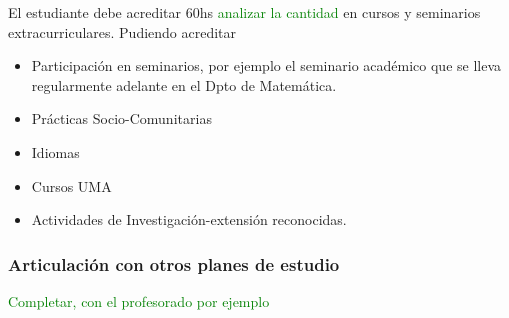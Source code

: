 \documentclass[a4paper, 12pt]{article}
\begin{document}
El estudiante debe acreditar 60hs \textcolor{green}{analizar la cantidad}
en cursos y seminarios extracurriculares. Pudiendo acreditar
\begin{itemize}
 \item Participación en seminarios, por ejemplo el seminario académico que se lleva regularmente adelante en el Dpto de Matemática.
 \item Prácticas Socio-Comunitarias 
 \item Idiomas
 \item Cursos UMA
 \item Actividades de Investigación-extensión reconocidas.
 \end{itemize}
 

\subsubsection{Articulación con otros planes de estudio}

\textcolor{green}{Completar, con el profesorado por ejemplo}
\end{document}
